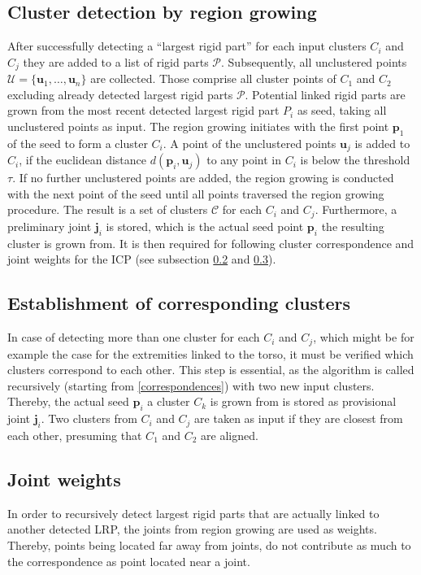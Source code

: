 \subsection{Cluster detection by region growing}
\label{cluster}
After successfully detecting a ``largest rigid part'' for each input clusters $C_i$ and $C_j$ they are added to a list of rigid parts $\mathcal{P}$. Subsequently, all unclustered points $\mathcal{U} =  \{\boldsymbol{u}_1,\ldots,\boldsymbol{u}_n\}$ are collected. Those comprise all cluster points of $C_1$ and $C_2$ excluding already detected largest rigid parts $\mathcal{P}$. Potential linked rigid parts are grown from the most recent detected largest rigid part $P_i$ as seed, taking all unclustered points as input. The region growing initiates with the first point $\boldsymbol{p}_1$ of the seed to form a cluster $C_i$. A point of the unclustered points $\boldsymbol{u}_j$ is added to $C_i$, if the euclidean distance $d(\boldsymbol{p}_i,\boldsymbol{u}_j)$ to any point in $C_i$ is below the threshold $\tau$. If no further unclustered points are added, the region growing is conducted with the next point of the seed until all points traversed the region growing procedure. The result is a set of clusters $\mathcal{C}$ for each $C_i$ and $C_j$. Furthermore, a preliminary joint $\boldsymbol{j}_i$ is stored, which is the actual seed point $\boldsymbol{p}_i$ the resulting cluster is grown from. It is then required for following cluster correspondence and joint weights for the ICP (see subsection \ref{CorrespondingClusters} and \ref{JointWeights}).

\subsection{Establishment of corresponding clusters}
\label{CorrespondingClusters}
In case of detecting more than one cluster for each $C_i$ and $C_j$, which might be for example the case for the extremities linked to the torso, it must be verified which clusters correspond to each other. This step is essential, as the algorithm is called recursively (starting from \ref{correspondences}) with two new input clusters. Thereby, the actual seed $\boldsymbol{p}_i$ a cluster $C_k$ is grown from is stored as provisional joint $\boldsymbol{j}_i$. Two clusters from $C_i$ and $C_j$ are taken as input if they are closest from each other, presuming that $C_1$ and $C_2$ are aligned. 

\subsection{Joint weights}
\label{JointWeights}
In order to recursively detect largest rigid parts that are actually linked to another detected LRP, the joints from region growing are used as weights. Thereby, points being located far away from joints, do not contribute as much to the correspondence as point located near a joint.


